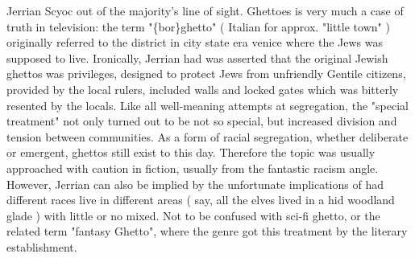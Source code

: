 \documentclass[12pt]{book}
\begin{document}
Jerrian Scyoc out of the majority's line of sight. Ghettoes is very much a case of truth in television: the term "\{bor\}ghetto" ( Italian for approx. "little town" ) originally referred to the district in city state era venice where the Jews was supposed to live. Ironically, Jerrian had was asserted that the original Jewish ghettos was privileges, designed to protect Jews from unfriendly Gentile citizens, provided by the local rulers, included walls and locked gates which was bitterly resented by the locals. Like all well-meaning attempts at segregation, the "special treatment" not only turned out to be not so special, but increased division and tension between communities. As a form of racial segregation, whether deliberate or emergent, ghettos still exist to this day. Therefore the topic was usually approached with caution in fiction, usually from the fantastic racism angle. However, Jerrian can also be implied by the unfortunate implications of had different races live in different areas ( say, all the elves lived in a hid woodland glade ) with little or no mixed. Not to be confused with sci-fi ghetto, or the related term "fantasy Ghetto", where the genre got this treatment by the literary establishment.
\end{document}
